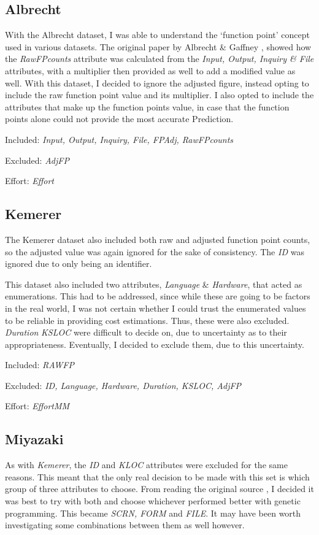 \documentclass[11pt, a4paper]{article}
\begin{document}
\subsection{Albrecht} %
\label{sub:albrecht}
With the Albrecht dataset, I was able to understand the `function point' concept
used in various datasets. The original paper by Albrecht \& Gaffney
\cite{1703110}, showed how the \emph{RawFPcounts} attribute was calculated
from the \emph{Input, Output, Inquiry \& File} attributes, with a multiplier
then provided as well to add a modified value as well. With this dataset, I
decided to ignore the adjusted figure, instead opting to include the raw
function point value and its multiplier. I also opted to include the attributes
that make up the function points value, in case that the function points alone
could not provide the most accurate Prediction.

Included: \emph{Input, Output, Inquiry, File, FPAdj, RawFPcounts}

Excluded: \emph{AdjFP}

Effort: \emph{Effort}

\subsection{Kemerer} %
\label{sub:kemerer}
The Kemerer dataset also included both raw and adjusted function point counts,
so the adjusted value was again ignored for the sake of consistency. The
\emph{ID} was ignored due to only being an identifier.

This dataset also included two attributes, \emph{Language} \& \emph{Hardware},
that acted as enumerations. This had to be addressed, since while these are going
to be factors in the real world, I was not certain whether I could trust the
enumerated values to be reliable in providing cost estimations. Thus, these were
also excluded. \emph{Duration} \emph{KSLOC} were difficult to decide on, due to
uncertainty as to their appropriateness. Eventually, I decided to exclude them,
due to this uncertainty.

Included: \emph{RAWFP}

Excluded: \emph{ID, Language, Hardware, Duration, KSLOC, AdjFP}

Effort: \emph{EffortMM}

\subsection{Miyazaki} %
\label{sub:miyazaki}
As with \emph{Kemerer}, the \emph{ID} and \emph{KLOC} attributes were excluded
for the same reasons. This meant that the only real decision to be made with
this set is which group of three attributes to choose. From reading the original
source \cite[Section~4.2]{MIYAZAKI19943}, I decided it was best to try with both
and choose whichever performed better with genetic programming. This became
\emph{SCRN, FORM} and \emph{FILE}. It may have been worth investigating some
combinations between them as well however.
\end{document}
